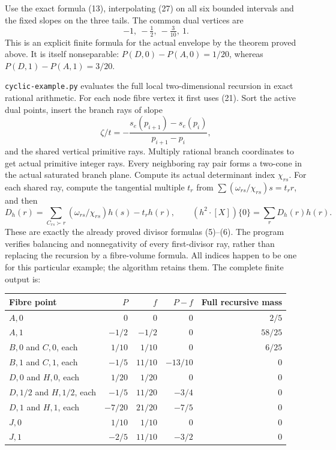 \documentclass[
  11pt,
]{article}
\begin{document}
Use the exact formula (13), interpolating (27) on all six bounded
intervals and the fixed slopes on the three tails. The common dual
vertices are \[
                         -1,\ -\tfrac12,\ -\tfrac3{10},\ 1.
\] This is an explicit finite formula for the actual envelope by the
theorem proved above. It is itself nonseparable: \(P(D,0)-P(A,0)=1/20\),
whereas \(P(D,1)-P(A,1)=3/20\).

\texttt{cyclic-example.py} evaluates the full local two-dimensional
recursion in exact rational arithmetic. For each node fibre vertex it
first uses (21). Sort the active dual points, insert the branch rays of
slope \[
 \zeta/t=-\frac{s_e(p_{i+1})-s_e(p_i)}{p_{i+1}-p_i},
\] and the shared vertical primitive rays. Multiply rational branch
coordinates to get actual primitive integer rays. Every neighboring ray
pair forms a two-cone in the actual saturated branch plane. Compute its
actual determinant index \(\chi_{rs}\). For each shared ray, compute the
tangential multiple \(t_r\) from \(\sum(\omega_{rs}/\chi_{rs})s=t_rr\),
and then \[
 D_h(r)=\sum_{C_{rs}\succ r}(\omega_{rs}/\chi_{rs})h(s)-t_rh(r),\qquad
                         (h^2\cdot[X])\{0\}=\sum_r D_h(r)h(r).            \tag{28}
\] These are exactly the already proved divisor formulas (5)--(6). The
program verifies balancing and nonnegativity of every first-divisor ray,
rather than replacing the recursion by a fibre-volume formula. All
indices happen to be one for this particular example; the algorithm
retains them. The complete finite output is:

\begin{longtable}[]{@{}lrrrr@{}}
\toprule\noalign{}
Fibre point & \(P\) & \(f\) & \(P-f\) & Full recursive mass \\
\midrule\noalign{}
\endhead
\bottomrule\noalign{}
\endlastfoot
\(A,0\) & 0 & 0 & 0 & \(2/5\) \\
\(A,1\) & \(-1/2\) & \(-1/2\) & 0 & \(58/25\) \\
\(B,0\) and \(C,0\), each & \(1/10\) & \(1/10\) & 0 & \(6/25\) \\
\(B,1\) and \(C,1\), each & \(-1/5\) & \(11/10\) & \(-13/10\) & 0 \\
\(D,0\) and \(H,0\), each & \(1/20\) & \(1/20\) & 0 & 0 \\
\(D,1/2\) and \(H,1/2\), each & \(-1/5\) & \(11/20\) & \(-3/4\) & 0 \\
\(D,1\) and \(H,1\), each & \(-7/20\) & \(21/20\) & \(-7/5\) & 0 \\
\(J,0\) & \(1/10\) & \(1/10\) & 0 & 0 \\
\(J,1\) & \(-2/5\) & \(11/10\) & \(-3/2\) & 0 \\
\end{longtable}
\end{document}
